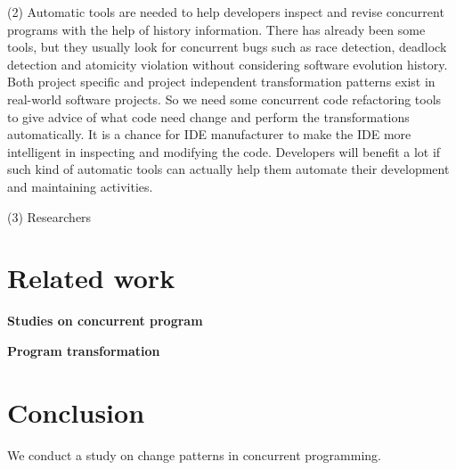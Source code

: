 \documentclass[conference]{IEEEtran}
\begin{document}
(2) Automatic tools are needed to help developers inspect and revise concurrent programs with the help of history information. There has already been some tools, but they usually look for concurrent bugs such as race detection, deadlock detection and atomicity violation without considering software evolution history. Both project specific and project independent transformation patterns exist in real-world software projects. So we need some concurrent code refactoring tools to give advice of what code need change and perform the transformations automatically. It is a chance for IDE manufacturer to make the IDE more intelligent in inspecting and modifying the code. Developers will benefit a lot if such kind of automatic tools can actually help them automate their development and maintaining activities.

(3) Researchers 

\section{Related work}
\textbf{Studies on concurrent program}

\textbf{Program transformation}

\section{Conclusion}
We conduct a study on change patterns in concurrent programming.


%
%
\end{document}
